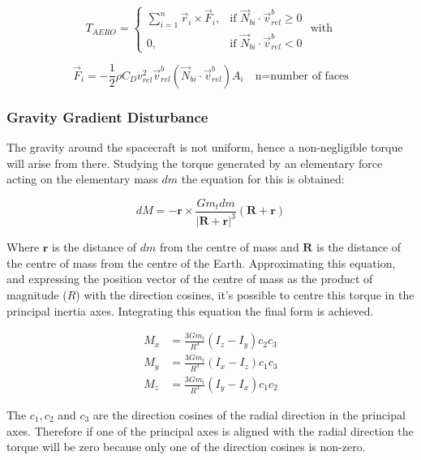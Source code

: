 \[
T_{AERO} =
\begin{cases}
	\sum_{i=1}^{n} \vec{r}_i \times \vec{F}_i, & \text{if } \vec{N}_{bi} \cdot \vec{v}^{b}_{rel} \geq 0 \\
	0, & \text{if } \vec{N}_{bi} \cdot \vec{v}^{b}_{rel} < 0
\end{cases}
\text{ with }
\]

\[
\vec{F}_i = -\frac{1}{2} \rho C_D v_{rel}^2 \vec{v}_{rel}^{b} (\vec{N}_{bi} \cdot \vec{v}_{rel}^{b}) A_i \quad \text{n=number of faces}
\]


\subsubsection{Gravity Gradient Disturbance}

The gravity around the spacecraft is not uniform, hence a non-negligible torque will arise from there. Studying the torque generated by an elementary force acting on the elementary mass \( dm \) the equation for this is obtained:

\begin{equation*}
	dM = -\mathbf{r} \times \frac{Gm_t dm}{|\mathbf{R} + \mathbf{r}|^3} (\mathbf{R} + \mathbf{r})
\end{equation*}

Where \( \mathbf{r} \) is the distance of \( dm \) from the centre of mass and \( \mathbf{R} \) is the distance of the centre of mass from the centre of the Earth. Approximating this equation, and expressing the position vector of the centre of mass as the product of magnitude (\( R \)) with the direction cosines, it’s possible to centre this torque in the principal inertia axes. Integrating this equation the final form is achieved.

\begin{align*}
	M_x &= \frac{3Gm_t}{R^3} (I_z - I_y)c_2c_3 \\
	M_y &= \frac{3Gm_t}{R^3} (I_x - I_z)c_1c_3 \\
	M_z &= \frac{3Gm_t}{R^3} (I_y - I_x)c_1c_2
\end{align*}

The \( c_1, c_2 \) and \( c_3 \) are the direction cosines of the radial direction in the principal axes. Therefore if one of the principal axes is aligned with the radial direction the torque will be zero because only one of the direction cosines is non-zero.



\label{subsubsec:dist_GG}
